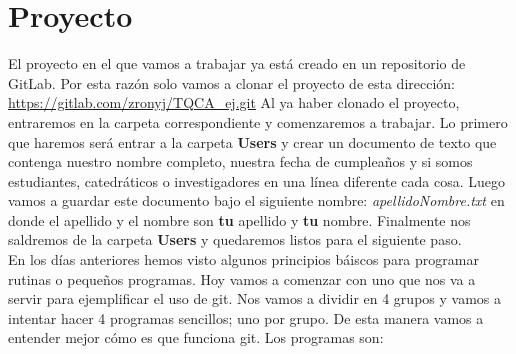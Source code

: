 \documentclass[10pt,letterpaper]{article}
\begin{document}
\section{Proyecto}
El proyecto en el que vamos a trabajar ya est\'a creado en un repositorio de GitLab. Por esta raz\'on solo vamos a clonar el proyecto de esta direcci\'on: \href{https://gitlab.com/zronyj/TQCA\_ej.git}{https://gitlab.com/zronyj/TQCA\_ej.git} Al ya haber clonado el proyecto, entraremos en la carpeta correspondiente y comenzaremos a trabajar. Lo primero que haremos ser\'a entrar a la carpeta \textbf{Users} y crear un documento de texto que contenga nuestro nombre completo, nuestra fecha de cumplea\~nos y si somos estudiantes, catedr\'aticos o investigadores en una l\'inea diferente cada cosa. Luego vamos a guardar este documento bajo el siguiente nombre: \emph{apellidoNombre.txt} en donde el apellido y el nombre son \textbf{tu} apellido y \textbf{tu} nombre. Finalmente nos saldremos de la carpeta \textbf{Users} y quedaremos listos para el siguiente paso.\\

En los d\'ias anteriores hemos visto algunos principios b\'aiscos para programar rutinas o peque\~nos programas. Hoy vamos a comenzar con uno que nos va a servir para ejemplificar el uso de git. Nos vamos a dividir en 4 grupos y vamos a intentar hacer 4 programas sencillos; uno por grupo. De esta manera vamos a entender mejor c\'omo es que funciona git. Los programas son:
\end{document}
